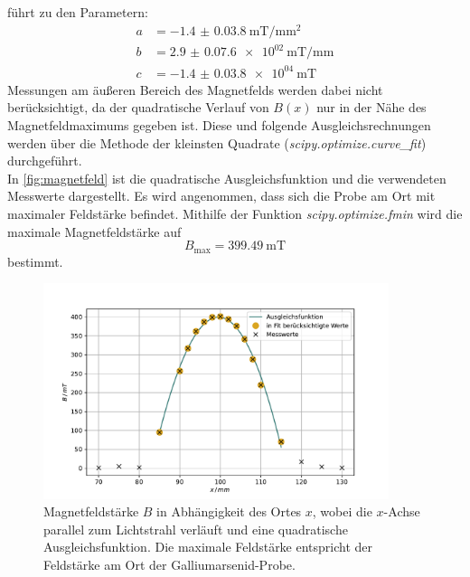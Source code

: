 führt zu den Parametern:
\begin{align*}
    a &= \qty{-1.4(0.038)}{\milli \tesla / \milli \metre^2} \\
    b &= \qty{2.9(0.076)e+02}{\milli \tesla / \milli \metre} \\
    c &= \qty{-1.4(0.038)e+04}{\milli \tesla}
\end{align*}
Messungen am äußeren Bereich des Magnetfelds werden dabei nicht berücksichtigt, da der quadratische Verlauf von $B(x)$ nur in der Nähe des Magnetfeldmaximums gegeben ist.
Diese und folgende Ausgleichsrechnungen werden über die Methode der kleinsten Quadrate (\textit{scipy.optimize.curve\_fit}\cite{scipy}) durchgeführt.
\\
In \autoref{fig:magnetfeld} ist die quadratische Ausgleichsfunktion und die verwendeten Messwerte dargestellt.
Es wird angenommen, dass sich die Probe am Ort mit maximaler Feldstärke befindet.
Mithilfe der Funktion \textit{scipy.optimize.fmin}\cite{scipy} wird die maximale Magnetfeldstärke auf
\begin{equation}
    B_\text{max} = \qty{399.49}{\milli\tesla}
\end{equation}
bestimmt.

\begin{figure}
    \centering
    \includegraphics[width=0.9\textwidth]{figure/magnetfeld.pdf}
    \caption{Magnetfeldstärke $B$ in Abhängigkeit des Ortes $x$, wobei die $x$-Achse parallel zum Lichtstrahl verläuft und eine quadratische Ausgleichsfunktion.
    Die maximale Feldstärke entspricht der Feldstärke am Ort der Galliumarsenid-Probe.}
    \label{fig:magnetfeld}
\end{figure}
\FloatBarrier

